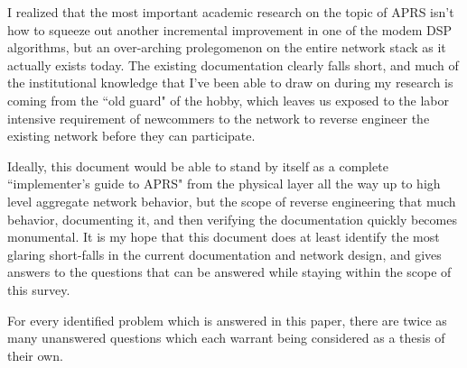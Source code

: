 I realized that the most important academic research on the topic of APRS isn't
how to squeeze out another incremental improvement in one of the modem DSP
algorithms, but an over-arching prolegomenon on the entire network stack as it 
actually exists today. The existing documentation clearly falls short, and 
much of the institutional knowledge that I've been able to draw on during 
my research is coming from the ``old guard" of the hobby, which leaves us exposed
to the labor intensive requirement of newcommers to the network to 
reverse engineer the existing network before they can participate.

Ideally, this document would be able to stand by itself as a complete 
``implementer's guide to APRS" from the physical layer all the way up to high level
aggregate network behavior, but the scope of reverse engineering that much
behavior, documenting it, and then verifying the documentation quickly becomes
monumental. 
It is my hope that this document does at least identify the most glaring 
short-falls in the current documentation and network design, and gives answers to
the questions that can be answered while staying within the scope of this survey.

For every identified problem which is answered in this paper, there
are twice as many unanswered questions which each warrant being considered 
as a thesis of their own.
